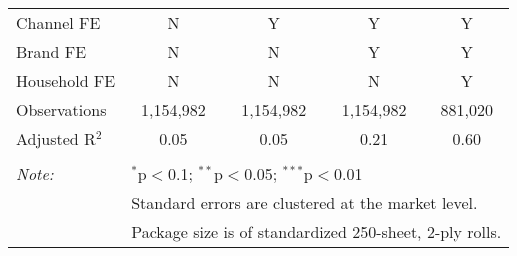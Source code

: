 \begin{table}[!htbp]
\begin{tabular}{@{\extracolsep{5pt}}lcccc}
Channel FE & N & Y & Y & Y \\ 
Brand FE & N & N & Y & Y \\ 
Household FE & N & N & N & Y \\ 
Observations & 1,154,982 & 1,154,982 & 1,154,982 & 881,020 \\ 
Adjusted R$^{2}$ & 0.05 & 0.05 & 0.21 & 0.60 \\ 
\hline 
\hline \\[-1.8ex] 
\textit{Note:}  & \multicolumn{4}{l}{$^{*}$p$<$0.1; $^{**}$p$<$0.05; $^{***}$p$<$0.01} \\ 
 & \multicolumn{4}{l}{Standard errors are clustered at the market level.} \\ 
 & \multicolumn{4}{l}{Package size is of standardized 250-sheet, 2-ply rolls.} \\ 
\end{tabular} 
\end{table} 
